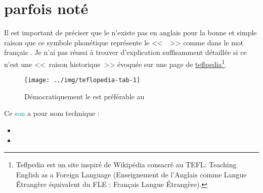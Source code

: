 \section{  parfois noté  
  }\label{sec:sone}

Il est important de préciser que le  n'existe pas en anglais
pour la bonne et simple raison que ce symbole phonétique représente le
<<~~>> comme dans le mot français . Je n'ai pas réussi à
trouver d'explication suffisamment détaillée si ce n'est une <<~raison
historique~>> évoquée sur une page de
\href{http://teflpedia.com/IPA_phonetic_symbol_\%E3\%80\%9A\%C9\%9B\%E3\%80\%9B}{teflpedia}\footnote{Teflpedia
est un site inspiré de Wikipédia consacré au TEFL: Teaching English as
a Foreign Language (Enseignement de l'Anglais comme Langue \'Etrangère
équivalent du FLE : Français Langue \'Etrangère).}.

\begin{center}
  \begin{figure}[h]
    \centering
    \texttt{[image: ../img/teflopedia-tab-1]}
    \caption[Quel symbole phonétique pour le son "è"]{Démocratiquement
      le  est préférable au }
    \label{fig:teflpedia-1}
  \end{figure}
\end{center}

Ce \textcolor{teal}{son} a pour nom technique :

\begin{itemize}
\item {}
\item {}
\end{itemize}

\indicsound


